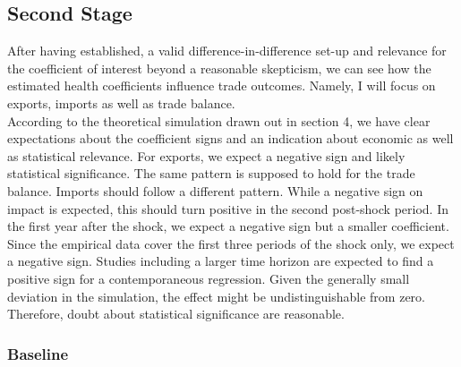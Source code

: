\documentclass{article}
\begin{document}
\subsection{Second Stage}

After having established, a valid difference-in-difference set-up and relevance for the coefficient of interest beyond a reasonable skepticism, we can see how the estimated health coefficients influence trade outcomes. Namely, I will focus on exports, imports as well as trade balance.\\
According to the theoretical simulation drawn out in section 4, we have clear expectations about the coefficient signs and an indication about economic as well as statistical relevance. For exports, we expect a negative sign and likely statistical significance. The same pattern is supposed to hold for the trade balance. Imports should follow a different pattern. While a negative sign on impact is expected, this should turn positive in the second post-shock period. In the first year after the shock, we expect a negative sign but a smaller coefficient. Since the empirical data cover the first three periods of the shock only, we expect a negative sign. Studies including a larger time horizon are expected to find a positive sign for a contemporaneous regression. Given the generally small deviation in the simulation, the effect might be undistinguishable from zero. Therefore, doubt about statistical significance are reasonable.

\subsubsection{Baseline}
\end{document}
